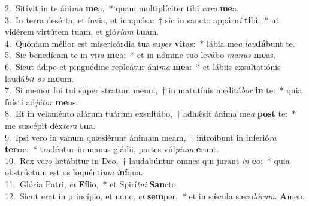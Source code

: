 {2.~}Sitívit in te áni\textit{ma} \textbf{me}a,~* quam multiplíciter tibi \textit{ca}\textit{ro} \textbf{me}a.\\
{3.~}In terra desérta, et ínvia, et inaquósa:~† sic in sancto appáru\textit{i} \textbf{ti}bi,~* ut vidérem virtútem tuam, et gló\textit{ri}\textit{am} \textbf{tu}am.\\
{4.~}Quóniam mélior est misericórdia tua su\textit{per} \textbf{vi}tas:~* lábia me\textit{a} \textit{lau}\textbf{dá}bunt te.\\
{5.~}Sic benedícam te in vi\textit{ta} \textbf{me}a:~* et in nómine tuo levábo \textit{ma}\textit{nus} \textbf{me}as.\\
{6.~}Sicut ádipe et pinguédine repleátur áni\textit{ma} \textbf{me}a:~* et lábiis exsultatiónis laudá\textit{bit} \textit{os} \textbf{me}um.\\
{7.~}Si memor fui tui super stratum meum,~† in matutínis meditá\textit{bor} \textbf{in} te:~* quia fuísti ad\textit{jú}\textit{tor} \textbf{me}us.\\
{8.~}Et in velaménto alárum tuárum exsultábo,~† adhǽsit ánima me\textit{a} \textbf{post} te:~* me suscépit déx\textit{te}\textit{ra} \textbf{tu}a.\\
{9.~}Ipsi vero in vanum quæsiérunt ánimam meam,~† introíbunt in inferió\textit{ra} \textbf{ter}ræ:~* tradéntur in manus gládii, partes vúl\textit{pi}\textit{um} \textbf{e}runt.\\
{10.~}Rex vero lætábitur in Deo,~† laudabúntur omnes qui jurant \textit{in} \textbf{e}o:~* quia obstrúctum est os loquénti\textit{um} \textit{i}\textbf{ní}qua.\\
{11.~}Glória Patri, \textit{et} \textbf{Fí}lio,~* et Spirí\textit{tu}\textit{i} \textbf{San}cto.\\
{12.~}Sicut erat in princípio, et nunc, \textit{et} \textbf{sem}per,~* et in sǽcula sæcu\textit{ló}\textit{rum}. \textbf{A}men.\\
